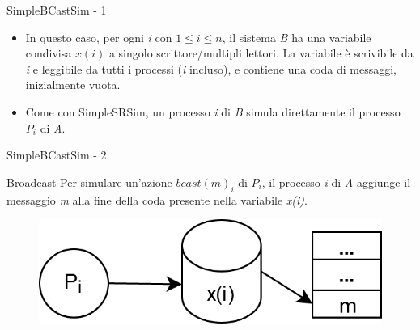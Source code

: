 \documentclass{beamer}
\begin{document}
    \begin{frame}{SimpleBCastSim - 1}
        \begin{itemize}[<+->]
            \item In questo caso, per ogni \textit{i} con $1 \leq i \leq n$, il sistema \textit{B} ha una variabile condivisa $x(i)$ a singolo scrittore/multipli lettori.
            \newline La variabile è scrivibile da \textit{i} e leggibile da tutti i processi (\textit{i} incluso), e contiene una coda di messaggi, inizialmente vuota.
            \item Come con SimpleSRSim, un processo \textit{i} di \textit{B} simula direttamente il processo $P_{i}$ di \textit{A}.
        \end{itemize}
    \end{frame}

    \begin{frame}{SimpleBCastSim - 2}
        \begin{block}{Broadcast}
            Per simulare un'azione $bcast(m)_{i}$ di $P_{i}$, il processo \textit{i} di \textit{A} aggiunge il messaggio \textit{m} alla fine della coda presente nella variabile \textit{x(i)}.
            \begin{figure}
                \centering
                \includegraphics[scale=0.3]{Broadcast.png}
            \end{figure}
        \end{block}
    \end{frame}
\end{document}
